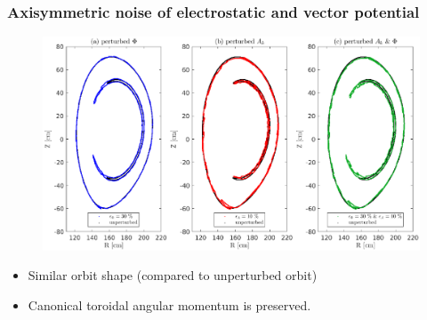 \documentclass{beamer}
\begin{document}
\begin{frame}
\frametitle{Axisymmetric noise of electrostatic and vector potential}
\vspace{-0.4cm}
\begin{figure}
	\hspace*{-1.05cm}\includegraphics[trim={0cm 0cm 0cm 0cm},clip,width=1\textwidth]{FIGURES/axissymetric_noise.eps}
\end{figure}
\begin{itemize}
	\vspace*{-0.6cm}
	\item Similar orbit shape (compared to unperturbed orbit)
	\item Canonical toroidal angular momentum is preserved.
\end{itemize}
\end{frame}

\end{document}
